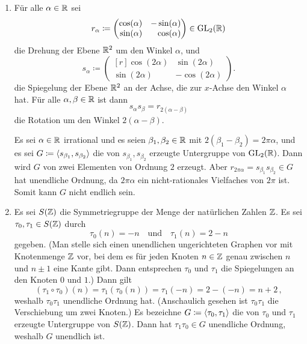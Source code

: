 \begin{solution}
\begin{enumerate}
\begin{enumerate}
        \item
          Für alle $\alpha \in \mathbb{R}$ sei
          \[
                      r_\alpha
            \coloneqq \begin{pmatrix*}[r]
                        \cos(\alpha)  & -\sin(\alpha) \\
                        \sin(\alpha)  &  \cos(\alpha)
                      \end{pmatrix*}
            \in       \GL_2(\Real)
          \]
          die Drehung der Ebene $\mathbb{R}^2$ um den Winkel $\alpha$, und
          \[
                      s_\alpha
            \coloneqq \begin{pmatrix*}[r]
                        \cos(2\alpha) &  \sin(2\alpha)  \\
                        \sin(2\alpha) & -\cos(2\alpha)
                      \end{pmatrix*}.
          \]
          die Spiegelung der Ebene $\mathbb{R}^2$ an der Achse, die zur $x$-Achse den Winkel $\alpha$ hat.
          Für alle $\alpha, \beta \in \mathbb{R}$ ist dann
          \[
              s_\alpha s_\beta
            = r_{2(\alpha-\beta)}
          \]
          die Rotation um den Winkel $2(\alpha - \beta)$.
          
          Es sei $\alpha \in \mathbb{R}$ irrational und es seien $\beta_1, \beta_2 \in \mathbb{R}$ mit $2(\beta_1 - \beta_2) = 2\pi\alpha$, und es sei $G \coloneqq \langle s_{\beta_1}, s_{\beta_2}\rangle$ die von $s_{\beta_1}, s_{\beta_2}$ erzeugte Untergruppe von $\operatorname{GL}_2(\mathbb{R})$.
          Dann wird $G$ von zwei Elementen von Ordnung $2$ erzeugt.
          Aber $r_{2\pi\alpha} = s_{\beta_1} s_{\beta_2} \in G$ hat unendliche Ordnung, da $2\pi\alpha$ ein nicht-rationales Vielfaches von $2\pi$ ist.
          Somit kann $G$ nicht endlich sein.
        \item
          Es sei $S(\mathbb{Z})$ die Symmetriegruppe der Menge der natürlichen Zahlen $\mathbb{Z}$.
          Es sei $\tau_0, \tau_1 \in S(\mathbb{Z})$ durch
          \[
              \tau_0(n)
            = -n
            \quad\text{und}\quad
              \tau_1(n)
            = 2-n
          \]
          gegeben.
          (Man stelle sich einen unendlichen ungerichteten Graphen vor mit Knotenmenge $\mathbb{Z}$ vor, bei dem es für jeden Knoten $n \in \mathbb{Z}$ genau zwischen $n$ und $n \pm 1$ eine Kante gibt.
          Dann entsprechen $\tau_0$ und $\tau_1$ die Spiegelungen an den Knoten $0$ und $1$.)
          Dann gilt
          \[
              (\tau_1 \circ \tau_0)(n)
            = \tau_1(\tau_0(n))
            = \tau_1(-n)
            = 2-(-n)
            = n+2 \,,
          \]
          weshalb $\tau_0 \tau_1$ unendliche Ordnung hat.
          (Anschaulich gesehen ist $\tau_0 \tau_1$ die Verschiebung um zwei Knoten.)
          Es bezeichne $G \coloneqq \langle\tau_0, \tau_1\rangle$ die von $\tau_0$ und $\tau_1$ erzeugte Untergruppe von $S(\mathbb{Z})$.
          Dann hat $\tau_1 \tau_0 \in G$ unendliche Ordnung, weshalb $G$ unendlich ist.
      \end{enumerate}
  \end{enumerate}
\end{solution}


